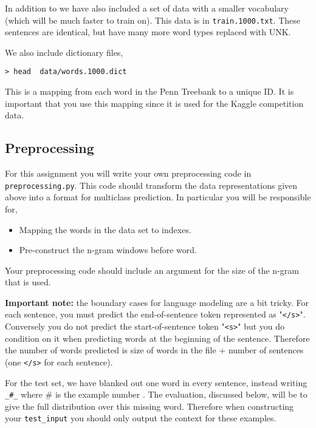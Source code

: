 \documentclass[11pt]{article}
\begin{document}
In addition to we have also included a set of data with a smaller vocabulary (which 
will be much faster to train on). This data is in \texttt{train.1000.txt}. 
These sentences are identical, but have many more word types replaced with UNK.

We also include dictionary files, 

\begin{verbatim}
> head  data/words.1000.dict 
\end{verbatim}

This is a mapping from each word in the Penn Treebank to
a unique ID. It is important that you use this mapping since it 
is used for the Kaggle competition data. 

\subsection{Preprocessing}

For this assignment you will write your own preprocessing code
in \texttt{preprocessing.py}. This code should transform the
data representations given above into a format for multiclass
prediction. In particular you will be responsible for,

\begin{itemize}
\item Mapping the words in the data set to indexes.
\item Pre-construct the n-gram windows before word.
\end{itemize}

Your preprocessing code should include an argument for the size of 
the n-gram that is used.

\textbf{Important note:} the boundary cases for language modeling are
a bit tricky. For each sentence, you must predict the end-of-sentence
token represented as "\texttt{</s>}". Conversely you do not predict the
start-of-sentence token "\texttt{<s>}" but you do condition on it when
predicting words at the beginning of the sentence. Therefore the
number of words predicted is size of words in the file + number of
sentences (one \texttt{</s>} for each sentence).


For the test set, we have blanked out one word in every sentence,
instead writing \texttt{\_\#\_} where \# is the example number .  The
evaluation, discussed below, will be to give the full distribution
over this missing word. Therefore when constructing your \texttt{test\_input}
you should only output the context for these examples.
\end{document}
